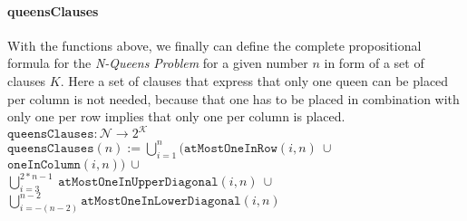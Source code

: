 \paragraph{queensClauses}
With the functions above, we finally can define the complete propositional formula for the \textit{N-Queens Problem} for a given number $n$ in form of a set of clauses $K$. Here a set of clauses that express that only one queen can be placed per column is not needed, because that one has to be placed in combination with only one per row implies that only one per column is placed.
\\[0.2cm]
\hspace*{1.3cm} $\texttt{queensClauses}: \mathcal{N} \to 2^{\mathcal{K}}$
\\[0.2cm]
\hspace*{1.3cm} $\texttt{queensClauses}(n) := \bigcup\limits_{i=1}^{n}(\texttt{atMostOneInRow}(i, n)\ \cup\ $
$\texttt{oneInColumn}(i, n))\ \cup\ $
\\[0.1cm]
\hspace*{6.1cm} $\bigcup\limits_{i=3}^{2 * n - 1}\ \texttt{atMostOneInUpperDiagonal}(i, n)\ \cup\ $
\\[0.1cm]
\hspace*{5.8cm} $\bigcup\limits_{i=-(n - 2)}^{n - 2}\texttt{atMostOneInLowerDiagonal}(i, n)$
